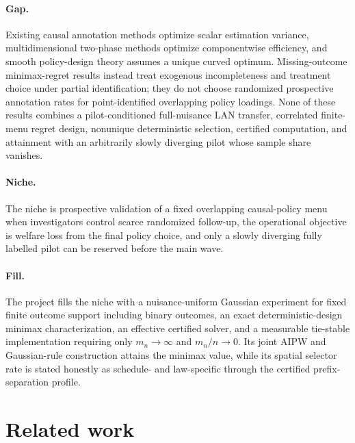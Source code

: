 \documentclass{article}
\begin{document}
\paragraph{Gap.} Existing causal annotation methods optimize scalar estimation variance, multidimensional two-phase methods optimize componentwise efficiency, and smooth policy-design theory assumes a unique curved optimum. Missing-outcome minimax-regret results instead treat exogenous incompleteness and treatment choice under partial identification; they do not choose randomized prospective annotation rates for point-identified overlapping policy loadings. None of these results combines a pilot-conditioned full-nuisance LAN transfer, correlated finite-menu regret design, nonunique deterministic selection, certified computation, and attainment with an arbitrarily slowly diverging pilot whose sample share vanishes.

\paragraph{Niche.} The niche is prospective validation of a fixed overlapping causal-policy menu when investigators control scarce randomized follow-up, the operational objective is welfare loss from the final policy choice, and only a slowly diverging fully labelled pilot can be reserved before the main wave.

\paragraph{Fill.} The project fills the niche with a nuisance-uniform Gaussian experiment for fixed finite outcome support including binary outcomes, an exact deterministic-design minimax characterization, an effective certified solver, and a measurable tie-stable implementation requiring only \(m_n\to\infty\) and \(m_n/n\to0\). Its joint AIPW and Gaussian-rule construction attains the minimax value, while its spatial selector rate is stated honestly as schedule- and law-specific through the certified prefix-separation profile.

\section{Related work}
\end{document}
